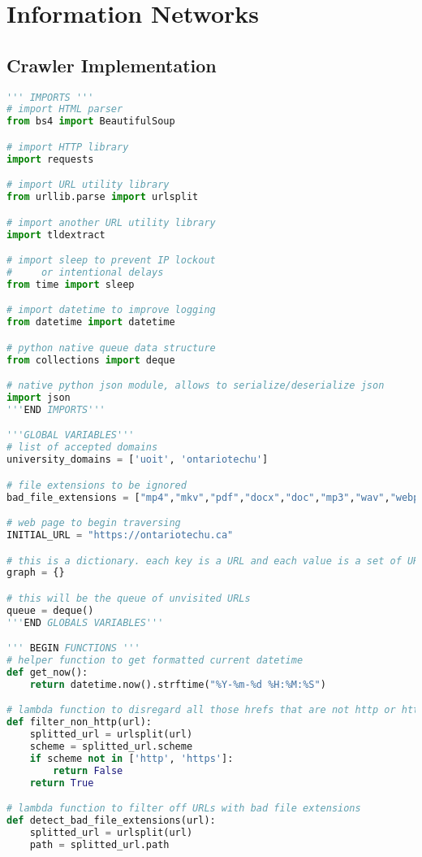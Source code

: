 \section{Information Networks}

\subsection{Crawler Implementation}
\begin{lstlisting}[language=Python]
''' IMPORTS '''
# import HTML parser
from bs4 import BeautifulSoup

# import HTTP library
import requests

# import URL utility library
from urllib.parse import urlsplit

# import another URL utility library
import tldextract

# import sleep to prevent IP lockout
#     or intentional delays
from time import sleep

# import datetime to improve logging
from datetime import datetime

# python native queue data structure
from collections import deque

# native python json module, allows to serialize/deserialize json
import json
'''END IMPORTS'''

'''GLOBAL VARIABLES'''
# list of accepted domains
university_domains = ['uoit', 'ontariotechu'] 

# file extensions to be ignored
bad_file_extensions = ["mp4","mkv","pdf","docx","doc","mp3","wav","webp", "jpg", "png"]

# web page to begin traversing
INITIAL_URL = "https://ontariotechu.ca"

# this is a dictionary. each key is a URL and each value is a set of URLs that are referenced by the key
graph = {}

# this will be the queue of unvisited URLs
queue = deque()
'''END GLOBALS VARIABLES'''

''' BEGIN FUNCTIONS '''
# helper function to get formatted current datetime
def get_now():
    return datetime.now().strftime("%Y-%m-%d %H:%M:%S")

# lambda function to disregard all those hrefs that are not http or https pages
def filter_non_http(url):
    splitted_url = urlsplit(url)
    scheme = splitted_url.scheme
    if scheme not in ['http', 'https']:
        return False
    return True

# lambda function to filter off URLs with bad file extensions
def detect_bad_file_extensions(url):
    splitted_url = urlsplit(url)
    path = splitted_url.path


\end{lstlisting}
